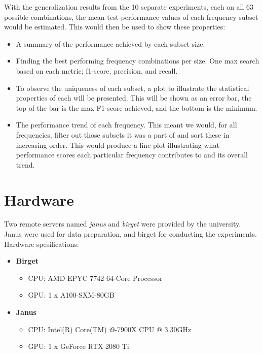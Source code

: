         With the generalization results from the 10 separate experiments, each on all 63 possible combinations, the mean test performance values of each frequency subset would be estimated. This would then be used to show these properties:
        
        
        \begin{itemize}
            \item A summary of the performance achieved by each subset size.
            \item Finding the best performing frequency combinations per size. One max search based on each metric; f1-score, precision, and recall.
            \item To observe the uniqueness of each subset, a plot to illustrate the statistical properties of each will be presented. This will be shown as an error bar, the top of the bar is the max F1-score achieved, and the bottom is the minimum. %
            \item The performance trend of each frequency. This meant we would, for all frequencies, filter out those subsets it was a part of and sort these in increasing order. This would produce a line-plot illustrating what performance scores each particular frequency contributes to and its overall trend.
        \end{itemize}
    


\section{Hardware} \label{hardware}
    Two remote servers named \textit{janus} and \textit{birget} were provided by the university. Janus were used for data preparation, and birget for conducting the experiments. Hardware spesifications: 
\begin{itemize}
  \item \textbf{Birget}
  \begin{itemize}
    \item CPU: AMD EPYC 7742 64-Core Processor
    \item GPU: 1 x A100-SXM-80GB
  \end{itemize}
  \item \textbf{Janus}
  \begin{itemize}
    \item CPU: Intel(R) Core(TM) i9-7900X CPU @ 3.30GHz
    \item GPU: 1 x GeForce RTX 2080 Ti
  \end{itemize}
\end{itemize}